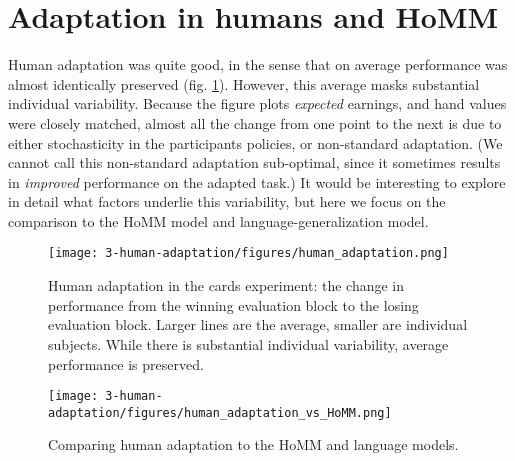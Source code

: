 \section{Adaptation in humans and HoMM}
Human adaptation was quite good, in the sense that on average performance was almost identically preserved (fig. \ref{fig:human_cards_adaptation_results}). However, this average masks substantial individual variability. Because the figure plots \emph{expected} earnings, and hand values were closely matched, almost all the change from one point to the next is due to either stochasticity in the participants policies, or non-standard adaptation. (We cannot call this non-standard adaptation sub-optimal, since it sometimes results in \emph{improved} performance on the adapted task.) It would be interesting to explore in detail what factors underlie this variability, but here we focus on the comparison to the HoMM model and language-generalization model. \par  
\begin{figure}
\centering
\texttt{[image: 3-human-adaptation/figures/human\_adaptation.png]}
\caption[Human adaptation in the cards experiment.]{Human adaptation in the cards experiment: the change in performance from the winning evaluation block to the losing evaluation block. Larger lines are the average, smaller are individual subjects. While there is substantial individual variability, average performance is preserved.} \label{fig:human_cards_adaptation_results}
\end{figure}

\begin{figure}
\centering
\texttt{[image: 3-human-adaptation/figures/human\_adaptation\_vs\_HoMM.png]}
\caption{Comparing human adaptation to the HoMM and language models.}\label{fig:human_cards_homm_results}
\end{figure}

